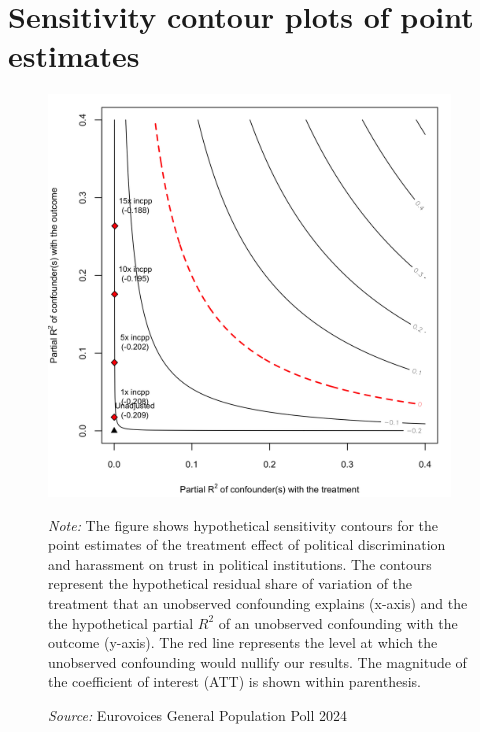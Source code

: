 \documentclass{article}
\begin{document}
\section{Sensitivity contour plots of point estimates}
\label{appendix:d}
\begin{figure}[htbp]
\centering
\includegraphics[width=0.95\textwidth]{"viz/sensitivity_analysis.png"}

\medskip
\justifying\footnotesize 
\textit{Note:} The figure shows hypothetical sensitivity contours for the point estimates of the treatment effect of political discrimination and harassment on trust in political institutions. The contours represent the hypothetical residual share of variation of the treatment that an unobserved confounding explains (x-axis) and the the hypothetical partial $R^2$ of an unobserved confounding with the outcome (y-axis). The red line represents the level at which the unobserved confounding would nullify our results. The magnitude of the coefficient of interest (ATT) is shown within parenthesis.

\textit{Source:} Eurovoices General Population Poll 2024
\end{figure}
\end{document}
